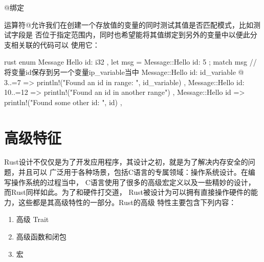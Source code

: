 \begin{outline}[enumerate]
\1 @绑定

运算符@允许我们在创建一个存放值的变量的同时测试其值是否匹配模式，比如测试字段是
否位于指定范围内，同时也希望能将其值绑定到另外的变量中以便此分支相关联的代码可以
使用它：
\begin{code-in-enumerate}{rust}
enum Message {
    Hello { id: i32 },
}
let msg = Message::Hello { id: 5 };
match msg {
    // 将变量id保存到另一个变量ip_variable当中
    Message::Hello { id: id_variable @ 3..=7 } => {
        println!("Found an id in range: {}", id_variable)
    },
    Message::Hello { id: 10..=12 } => {
        println!("Found an id in another range")
    },
    Message::Hello { id } => {
        println!("Found some other id: {}", id)
    },
}
\end{code-in-enumerate}
\end{outline}

\section{高级特征}
Rust设计不仅仅是为了开发应用程序，其设计之初，就是为了解决内存安全的问题，并且可以
广泛用于各种场景，包括C语言的专属领域：操作系统设计。在编写操作系统的过程当中，
C语言使用了很多的高级宏定义以及一些精妙的设计，而Rust同样如此。为了和硬件打交道，
Rust被设计为可以拥有直接操作硬件的能力，这些都是其高级特性的一部分。Rust的高级
特性主要包含下列内容：
\begin{enumerate}
  \item 高级 Trait
  \item 高级函数和闭包
  \item 宏
\end{enumerate}

